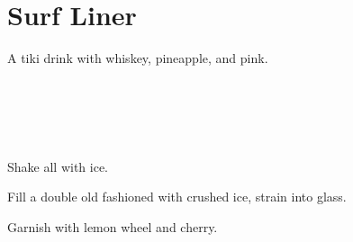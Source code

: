 \section[Surf Liner]{
    Surf Liner
}

\begin{recipestats}[
        servings=1,
        preptime=5~\minute,
        original=\citeauthor{surfLinerGabeFonseca}~\cite{surfLinerGabeFonseca},
    ]
\end{recipestats}

\begin{recipeabstract}
    A tiki drink with whiskey, pineapple, and pink.
\end{recipeabstract}

\begin{ingredientcolumns}
    \begin{ingredientblock}
        \\
    \end{ingredientblock}

    \begin{ingredientblock}
        \\
        \\
    \end{ingredientblock}
\end{ingredientcolumns}

\begin{preparation}
\item Shake all with ice.
\item Fill a double old fashioned with crushed ice, strain into glass.
\item Garnish with lemon wheel and cherry.
\end{preparation}

\recipeend%
